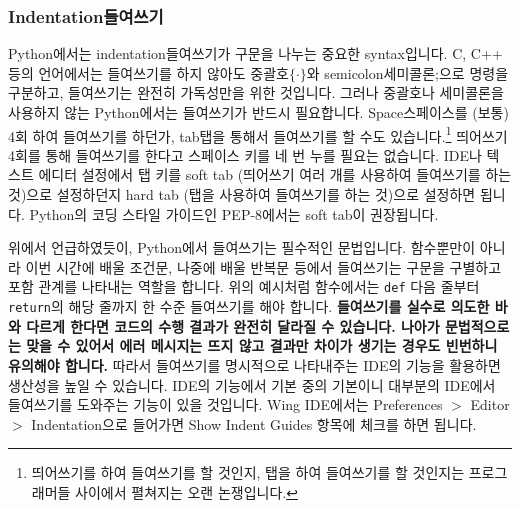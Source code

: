 \documentclass[../main.tex]{subfiles}
\begin{document}
\subsubsection{Indentation들여쓰기}
Python에서는 indentation들여쓰기가 구문을 나누는 중요한 syntax입니다.
C, C++ 등의 언어에서는 들여쓰기를 하지 않아도 중괄호$\{\cdot\}$와 semicolon세미콜론;으로 명령을 구분하고, 들여쓰기는 완전히 가독성만을 위한 것입니다.
그러나 중괄호나 세미콜론을 사용하지 않는 Python에서는 들여쓰기가 반드시 필요합니다.
Space스페이스를 (보통) 4회 하여 들여쓰기를 하던가, tab탭을 통해서 들여쓰기를 할 수도 있습니다.\footnote{띄어쓰기를 하여 들여쓰기를 할 것인지, 탭을 하여 들여쓰기를 할 것인지는 프로그래머들 사이에서 펼쳐지는 오랜 논쟁입니다.}
띄어쓰기 4회를 통해 들여쓰기를 한다고 스페이스 키를 네 번 누를 필요는 없습니다.
IDE나 텍스트 에디터 설정에서 탭 키를 soft tab (띄어쓰기 여러 개를 사용하여 들여쓰기를 하는 것)으로 설정하던지 hard tab (탭을 사용하여 들여쓰기를 하는 것)으로 설정하면 됩니다.
Python의 코딩 스타일 가이드인 PEP-8에서는 soft tab이 권장됩니다.

위에서 언급하였듯이, Python에서 들여쓰기는 필수적인 문법입니다.
함수뿐만이 아니라 이번 시간에 배울 조건문, 나중에 배울 반복문 등에서 들여쓰기는 구문을 구별하고 포함 관계를 나타내는 역할을 합니다.
위의 예시처럼 함수에서는 \texttt{def} 다음 줄부터 \texttt{return}의 해당 줄까지 한 수준 들여쓰기를 해야 합니다.
\textbf{들여쓰기를 실수로 의도한 바와 다르게 한다면 코드의 수행 결과가 완전히 달라질 수 있습니다.
나아가 문법적으로는 맞을 수 있어서 에러 메시지는 뜨지 않고 결과만 차이가 생기는 경우도 빈번하니 유의해야 합니다.}
따라서 들여쓰기를 명시적으로 나타내주는 IDE의 기능을 활용하면 생산성을 높일 수 있습니다.
IDE의 기능에서 기본 중의 기본이니 대부분의 IDE에서 들여쓰기를 도와주는 기능이 있을 것입니다.
Wing IDE에서는 Preferences $>$ Editor $>$ Indentation으로 들어가면 Show Indent Guides 항목에 체크를 하면 됩니다.
\end{document}
